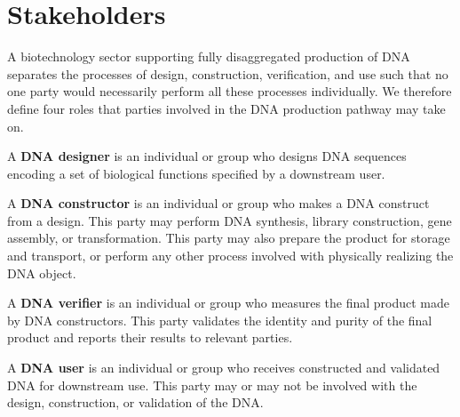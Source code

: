 \documentclass[12pt,letterpaper,english]{article}
\begin{document}
\section{Stakeholders}
A biotechnology sector supporting fully disaggregated production of DNA separates the processes of design, construction, verification, and use such that no one party would necessarily perform all these processes individually. We therefore define four roles that parties involved in the DNA production pathway may take on. \par
A \textbf{DNA designer} is an individual or group who designs DNA sequences encoding a set of biological functions specified by a downstream user. \par
A \textbf{DNA constructor} is an individual or group who makes a DNA construct from a design. This party may perform DNA synthesis, library construction, gene assembly, or transformation. This party may also prepare the product for storage and transport, or perform any other process involved with physically realizing the DNA object. \par
A \textbf{DNA verifier} is an individual or group who measures the final product made by DNA constructors. This party validates the identity and purity of the final product and reports their results to relevant parties. \par
A \textbf{DNA user} is an individual or group who receives constructed and validated DNA for downstream use. This party may or may not be involved with the design, construction, or validation of the DNA. \par
\end{document}
